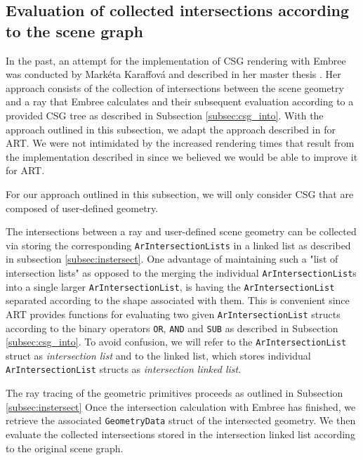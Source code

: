 \subsection{Evaluation of collected intersections according to the scene graph}
\label{subsec:apprach1}

In the past, an attempt for the implementation of CSG rendering with Embree was conducted by Markéta Karaffová and described in her master thesis \cite{karaffova2016}. Her approach consists of the collection of intersections between the scene geometry and a ray that Embree calculates and their subsequent evaluation according to a provided CSG tree as described in Subsection \ref{subsec:csg_into}.
With the approach outlined in this subsection, we adapt the approach described in \cite{karaffova2016} for ART. We were not intimidated by the increased rendering times that result from the implementation described in \cite{karaffova2016} since we believed we would be able to improve it for ART.

For our approach outlined in this subsection, we will only consider CSG that are composed of user-defined geometry.

The intersections between a ray and user-defined scene geometry can be collected via storing the corresponding \texttt{ArIntersectionLists} in a linked list as described in subsection \ref{subsec:instersect}. One advantage of maintaining such a "list of intersection lists" as opposed to the merging the individual \texttt{ArIntersectionList}s into a single larger \texttt{ArIntersectionList}, is having the \texttt{ArIntersectionList} separated according to the shape associated with them. This is convenient since ART provides functions for evaluating two given \texttt{ArIntersectionList} structs according to the binary operators \texttt{OR}, \texttt{AND} and \texttt{SUB} as described in Subsection \ref{subsec:csg_into}. To avoid confusion, we will refer to the \texttt{ArIntersectionList} struct as \emph{intersection list} and to the linked list, which stores individual \texttt{ArIntersectionList} structs as \emph{intersection linked list}.

The ray tracing of the geometric primitives proceeds as outlined in Subsection \ref{subsec:instersect}
Once the intersection calculation with Embree has finished, we retrieve the associated \texttt{GeometryData} struct of the intersected geometry. We then evaluate the collected intersections stored in the intersection linked list according to the original scene graph.

